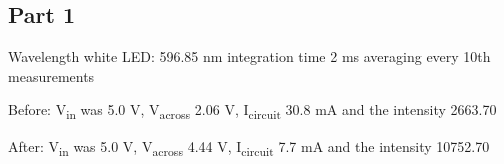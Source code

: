     
\subsection{Part 1}

Wavelength white LED: 596.85 nm 
integration time 2 ms 
averaging every 10th measurements

Before: V\textsubscript{in} was 5.0 V, V\textsubscript{across} 2.06 V, I\textsubscript{circuit} 30.8 mA and the intensity 2663.70

After: V\textsubscript{in} was 5.0 V, V\textsubscript{across} 4.44 V, I\textsubscript{circuit} 7.7 mA and the intensity 10752.70

